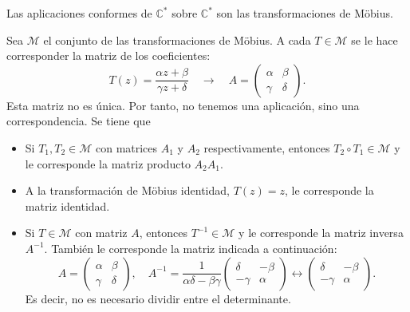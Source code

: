 \begin{remark}
    Las aplicaciones conformes de $\mathbb{C}^\ast$ sobre $\mathbb{C}^\ast$ son las transformaciones de Möbius.
\end{remark}

Sea $\mathcal{M}$ el conjunto de las transformaciones de Möbius.
A cada $T \in \mathcal{M}$ se le hace corresponder la matriz de los coeficientes:
$$T(z) = \frac{\alpha z + \beta}{\gamma z + \delta} \quad \to \quad A = \begin{pmatrix}
        \alpha & \beta  \\
        \gamma & \delta
    \end{pmatrix}.$$
Esta matriz no es única.
Por tanto, no tenemos una aplicación, sino una correspondencia.
Se tiene que
\begin{itemize}
    \item Si $T_1, T_2 \in \mathcal{M}$ con matrices $A_1$ y $A_2$ respectivamente, entonces $T_2 \circ T_1 \in \mathcal{M}$ y le corresponde la matriz producto $A_2A_1$.
    \item A la transformación de Möbius identidad, $T(z) = z$, le corresponde la matriz identidad.
    \item Si $T \in \mathcal{M}$ con matriz $A$, entonces $T^{-1} \in \mathcal{M}$ y le corresponde la matriz inversa $A^{-1}$.
          También le corresponde la matriz indicada a continuación:
          $$A = \begin{pmatrix}
                  \alpha & \beta  \\
                  \gamma & \delta
              \end{pmatrix}, \quad A^{-1} = \frac{1}{\alpha\delta - \beta\gamma}\begin{pmatrix}
                  \delta  & -\beta \\
                  -\gamma & \alpha
              \end{pmatrix} \leftrightarrow \begin{pmatrix}
                  \delta  & -\beta \\
                  -\gamma & \alpha
              \end{pmatrix}.$$
          Es decir, no es necesario dividir entre el determinante.
\end{itemize}

